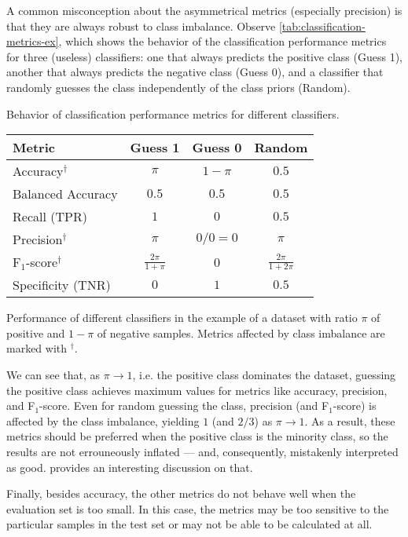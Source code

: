 A common misconception about the asymmetrical metrics (especially precision) is that they
are always robust to class imbalance.  Observe \cref{tab:classification-metrics-ex}, which shows
the behavior of the classification performance metrics for three (useless) classifiers: one
that always predicts the positive class (Guess 1), another that always predicts the
negative class (Guess 0), and a classifier that randomly guesses the class independently
of the class priors (Random).

\begin{tablebox}[label=tab:classification-metrics-ex]{Behavior of classification
  performance metrics for different classifiers.}
  \centering
  \begin{tabular}{l c c c}
    \toprule
    \textbf{Metric} & \textbf{Guess 1} & \textbf{Guess 0} & \textbf{Random} \\
    \midrule
    Accuracy$^\dagger$ & $\pi$ & $1 - \pi$ & $0.5$ \\
    Balanced Accuracy & $0.5$ & $0.5$ & $0.5$ \\
    Recall (TPR) & $1$ & $0$ & $0.5$ \\
    Precision$^\dagger$ & $\pi$ & $0/0 = 0$ & $\pi$ \\
    F$_1$-score$^\dagger$ & $\frac{2 \pi}{1 + \pi}$ & 0 & $\frac{2 \pi}{1 + 2\pi}$ \\
    Specificity (TNR) & $0$ & $1$ & $0.5$ \\
    \bottomrule
  \end{tabular}
  \tcblower
  Performance of different classifiers in the example of a dataset with ratio $\pi$ of
  positive and $1-\pi$ of negative samples.  Metrics affected by class imbalance are
  marked with $^\dagger$.
\end{tablebox}

We can see that, as $\pi \to 1$, i.e. the positive class dominates the dataset, guessing
the positive class achieves maximum values for metrics like accuracy, precision, and
F$_1$-score.  Even for random guessing the class, precision (and F$_1$-score) is affected
by the class imbalance, yielding $1$ (and $2/3$) as $\pi \to 1$.  As a result, these
metrics should be preferred when the positive class is the minority class, so the results
are not errouneously inflated --- and, consequently, mistakenly interpreted as good.
\textcite{Williams2021} provides an interesting discussion on
that.

Finally, besides accuracy, the other metrics do not behave well when the evaluation set is
too small.  In this case, the metrics may be too sensitive to the particular samples in
the test set or may not be able to be calculated at all.

